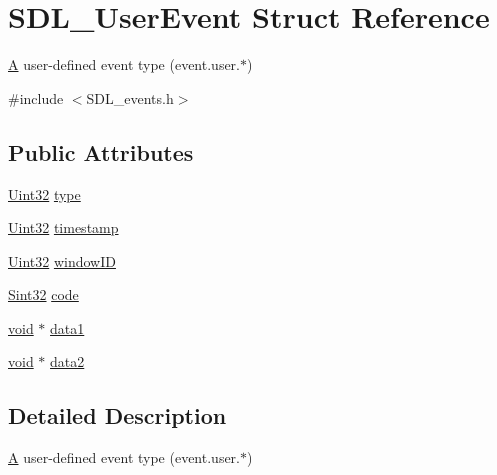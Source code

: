 \hypertarget{struct_s_d_l___user_event}{}\section{S\+D\+L\+\_\+\+User\+Event Struct Reference}
\label{struct_s_d_l___user_event}


\mbox{\hyperlink{struct_a}{A}} user-\/defined event type (event.\+user.$\ast$)  




{\ttfamily \#include $<$S\+D\+L\+\_\+events.\+h$>$}

\subsection*{Public Attributes}
\begin{DoxyCompactItemize}
\item 
\mbox{\hyperlink{_s_d_l__stdinc_8h_add440eff171ea5f55cb00c4a9ab8672d}{Uint32}} \mbox{\hyperlink{struct_s_d_l___user_event_ab7afa8b98dbd7b52bef41155e10f7340}{type}}
\item 
\mbox{\hyperlink{_s_d_l__stdinc_8h_add440eff171ea5f55cb00c4a9ab8672d}{Uint32}} \mbox{\hyperlink{struct_s_d_l___user_event_adbf1d34c73138a0c549310e5d4ad0c35}{timestamp}}
\item 
\mbox{\hyperlink{_s_d_l__stdinc_8h_add440eff171ea5f55cb00c4a9ab8672d}{Uint32}} \mbox{\hyperlink{struct_s_d_l___user_event_abccefa10e0e0e3a0801bc6d836a08da7}{window\+ID}}
\item 
\mbox{\hyperlink{_s_d_l__stdinc_8h_a7a90b941db9d4582e9ad7abb9940ff7e}{Sint32}} \mbox{\hyperlink{struct_s_d_l___user_event_aef47976781ee82b527a353c5acfa0a34}{code}}
\item 
\mbox{\hyperlink{_s_d_l__opengles2__gl2ext_8h_ae5d8fa23ad07c48bb609509eae494c95}{void}} $\ast$ \mbox{\hyperlink{struct_s_d_l___user_event_ab2893a12be2f97195f16463a23107913}{data1}}
\item 
\mbox{\hyperlink{_s_d_l__opengles2__gl2ext_8h_ae5d8fa23ad07c48bb609509eae494c95}{void}} $\ast$ \mbox{\hyperlink{struct_s_d_l___user_event_aae4dbf65c34d654c9edf519eb061b7cf}{data2}}
\end{DoxyCompactItemize}


\subsection{Detailed Description}
\mbox{\hyperlink{struct_a}{A}} user-\/defined event type (event.\+user.$\ast$) 

